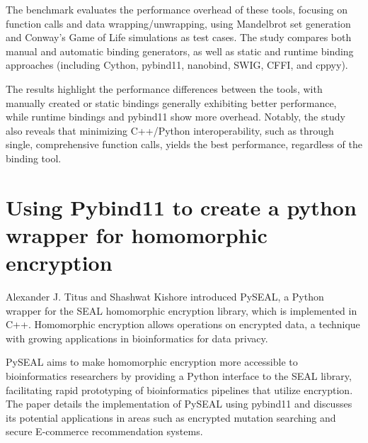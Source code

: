 The benchmark evaluates the performance overhead of these tools, focusing on function calls and data wrapping/unwrapping, using Mandelbrot set generation and Conway's Game of Life simulations as test cases. The study compares both manual and automatic binding generators, as well as static and runtime binding approaches (including Cython, pybind11, nanobind, SWIG, CFFI, and cppyy). 

The results highlight the performance differences between the tools, with manually created or static bindings generally exhibiting better performance, while runtime bindings and pybind11 show more overhead. Notably, the study also reveals that minimizing C++/Python interoperability, such as through single, comprehensive function calls, yields the best performance, regardless of the binding tool.

\section{Using Pybind11 to create a python wrapper for homomorphic encryption}

Alexander J. Titus and Shashwat Kishore introduced PySEAL, a Python wrapper for the SEAL homomorphic encryption library, which is implemented in C++. Homomorphic encryption allows operations on encrypted data, a technique with growing applications in bioinformatics for data privacy. 

PySEAL aims to make homomorphic encryption more accessible to bioinformatics researchers by providing a Python interface to the SEAL library, facilitating rapid prototyping of bioinformatics pipelines that utilize encryption. The paper details the implementation of PySEAL using pybind11 and discusses its potential applications in areas such as encrypted mutation searching and secure E-commerce recommendation systems.